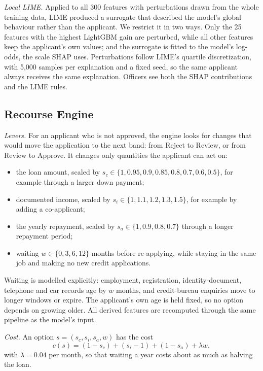 \emph{Local LIME.} Applied to all 300 features with perturbations drawn from the whole training data, LIME produced a
surrogate that described the model's global behaviour rather than the applicant. We restrict it in two ways. Only the
25 features with the highest LightGBM gain are perturbed, while all other features keep the applicant's own values;
and the surrogate is fitted to the model's log-odds, the scale SHAP uses. Perturbations follow LIME's quartile
discretization, with 5{,}000 samples per explanation and a fixed seed, so the same applicant always receives the same
explanation. Officers see both the SHAP contributions and the LIME rules.

\subsection{Recourse Engine}
\label{sec:recourse}
\emph{Levers.} For an applicant who is not approved, the engine looks for changes that would move the application to
the next band: from Reject to Review, or from Review to Approve. It changes only quantities the applicant can act on:
\begin{itemize}
\item the loan amount, scaled by $s_c \in \{1, 0.95, 0.9, 0.85, 0.8, 0.7, 0.6, 0.5\}$, for example through a larger
down payment;
\item documented income, scaled by $s_i \in \{1, 1.1, 1.2, 1.3, 1.5\}$, for example by adding a co-applicant;
\item the yearly repayment, scaled by $s_a \in \{1, 0.9, 0.8, 0.7\}$ through a longer repayment period;
\item waiting $w \in \{0, 3, 6, 12\}$ months before re-applying, while staying in the same job and making no new
credit applications.
\end{itemize}
Waiting is modelled explicitly: employment, registration, identity-document, telephone and car records age by $w$
months, and credit-bureau enquiries move to longer windows or expire. The applicant's own age is held fixed, so no
option depends on growing older. All derived features are recomputed through the same pipeline as the model's input.

\emph{Cost.} An option $s = (s_c, s_i, s_a, w)$ has the cost
\begin{equation}
c(s) = (1 - s_c) + (s_i - 1) + (1 - s_a) + \lambda w,
\label{eq:cost}
\end{equation}
with $\lambda = 0.04$ per month, so that waiting a year costs about as much as halving the loan.

